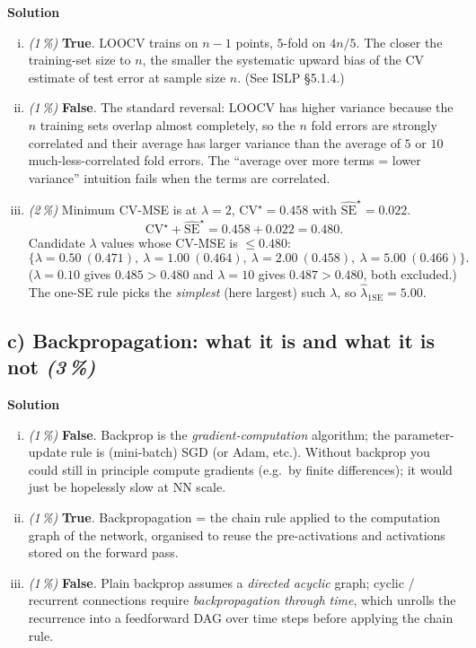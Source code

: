 \documentclass[11pt,a4paper]{article}
\newcommand{\subpoints}[1]{\textit{(#1\,\%)}}
\newcommand{\sol}{\noindent\textbf{Solution}}
\begin{document}
\sol{}
\begin{enumerate}[(i)]
  \item \subpoints{1} \textbf{True}. LOOCV trains on $n-1$ points, $5$-fold on $4n/5$. The closer
        the training-set size to $n$, the smaller the systematic upward bias of the CV estimate of
        test error at sample size $n$. (See ISLP \S5.1.4.)

  \item \subpoints{1} \textbf{False}. The standard reversal: LOOCV has higher variance because the
        $n$ training sets overlap almost completely, so the $n$ fold errors are strongly correlated
        and their average has larger variance than the average of $5$ or $10$ much-less-correlated
        fold errors. The ``average over more terms = lower variance'' intuition fails when the
        terms are correlated.

  \item \subpoints{2} Minimum CV-MSE is at $\lambda = 2$, $\mathrm{CV}^\star = 0.458$ with
        $\widehat{\mathrm{SE}}^\star = 0.022$.
        $$\mathrm{CV}^\star + \widehat{\mathrm{SE}}^\star = 0.458 + 0.022 = \boxed{0.480}.$$
        Candidate $\lambda$ values whose CV-MSE is $\leq 0.480$:
        $$\{\lambda = 0.50\ (0.471),\ \lambda = 1.00\ (0.464),\ \lambda = 2.00\ (0.458),\ \lambda = 5.00\ (0.466)\}.$$
        ($\lambda = 0.10$ gives $0.485 > 0.480$ and $\lambda = 10$ gives $0.487 > 0.480$, both
        excluded.) The one-SE rule picks the \emph{simplest} (here largest) such $\lambda$, so
        $\hat\lambda_{1\mathrm{SE}} = \boxed{5.00}$.
\end{enumerate}

\subsection*{c) Backpropagation: what it is and what it is not \subpoints{3}}

\sol{}
\begin{enumerate}[(i)]
  \item \subpoints{1} \textbf{False}. Backprop is the \emph{gradient-computation} algorithm; the
        parameter-update rule is (mini-batch) SGD (or Adam, etc.). Without backprop you could still
        in principle compute gradients (e.g.\ by finite differences); it would just be hopelessly
        slow at NN scale.
  \item \subpoints{1} \textbf{True}. Backpropagation = the chain rule applied to the computation
        graph of the network, organised to reuse the pre-activations and activations stored on the
        forward pass.
  \item \subpoints{1} \textbf{False}. Plain backprop assumes a \emph{directed acyclic} graph;
        cyclic / recurrent connections require \emph{backpropagation through time}, which unrolls
        the recurrence into a feedforward DAG over time steps before applying the chain rule.
\end{enumerate}
\end{document}
